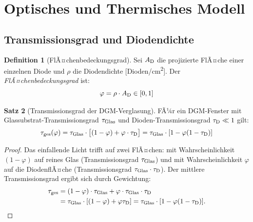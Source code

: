 ﻿\documentclass[a4paper,12pt]{article}
\theoremstyle{definition}
\newtheorem{definition}{Definition}[section]
\newtheorem{satz}[definition]{Satz}
\theoremstyle{remark}
\newcommand{\vph}{\varphi}
\begin{document}
\section{Optisches und Thermisches Modell}
\label{sec:optisch}

\subsection{Transmissionsgrad und Diodendichte}

\begin{definition}[FlÃ¤chenbedeckungsgrad]
\label{def:phi}
Sei $A_{\rm D}$ die projizierte FlÃ¤che einer einzelnen Diode und $\rho$
die Diodendichte [Dioden/cm\textsuperscript{2}]. Der \emph{FlÃ¤chenbedeckungsgrad}
ist:
\begin{equation}
  \vph = \rho \cdot A_{\rm D} \in [0, 1]
  \label{eq:phi_def}
\end{equation}
\end{definition}

\begin{satz}[Transmissionsgrad der DGM-Verglasung]
\label{satz:transmiss}
FÃ¼r ein DGM-Fenster mit Glassubs\-trat-Transmissionsgrad $\tau_{\rm Glas}$
und Dioden-Transmissionsgrad $\tau_{\rm D} \ll 1$ gilt:
\begin{equation}
  \tau_{\rm ges}(\vph) = \tau_{\rm Glas} \cdot
    \bigl[(1 - \vph) + \vph \cdot \tau_{\rm D}\bigr]
  = \tau_{\rm Glas} \cdot [1 - \vph(1 - \tau_{\rm D})]
  \label{eq:tau}
\end{equation}
\end{satz}

\begin{proof}
Das einfallende Licht trifft auf zwei FlÃ¤chen: mit Wahrscheinlichkeit $(1-\vph)$
auf reines Glas (Transmissionsgrad $\tau_{\rm Glas}$) und mit Wahrscheinlichkeit
$\vph$ auf die DiodenflÃ¤che (Transmissionsgrad $\tau_{\rm Glas} \cdot \tau_{\rm D}$).
Der mittlere Transmissionsgrad ergibt sich durch Gewichtung:
\begin{align*}
  \tau_{\rm ges} &= (1-\vph) \cdot \tau_{\rm Glas}
                  + \vph \cdot \tau_{\rm Glas} \cdot \tau_{\rm D}\\
                &= \tau_{\rm Glas} \cdot [(1-\vph) + \vph \tau_{\rm D}]
                 = \tau_{\rm Glas} \cdot [1 - \vph(1-\tau_{\rm D})]. \qedhere
\end{align*}
\end{proof}
\end{document}
